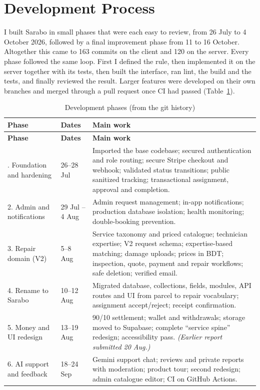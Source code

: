 \documentclass{standalone}
\begin{document}
\section{Development Process}
I built Sarabo in small phases that were each easy to review, from 26 July to 4 October 2026, followed by a final improvement phase from 11 to 16 October. Altogether this came to 163 commits on the client and 120 on the server. Every phase followed the same loop. First I defined the rule, then implemented it on the server together with its tests, then built the interface, ran lint, the build and the tests, and finally reviewed the result. Larger features were developed on their own branches and merged through a pull request once CI had passed (Table~\ref{tab:phases}).

\begin{longtable}{@{}p{3.2cm}p{2.2cm}p{8.8cm}@{}}
\caption{Development phases (from the git history)}\label{tab:phases}\\
\toprule
\textbf{Phase} & \textbf{Dates} & \textbf{Main work} \\
\midrule
\endfirsthead
\toprule
\textbf{Phase} & \textbf{Dates} & \textbf{Main work} \\
\midrule
\endhead
\bottomrule
\endfoot
1. Foundation and hardening & 26--28 Jul & Imported the base codebase; secured authentication and role routing; secure Stripe checkout and webhook; validated status transitions; public sanitized tracking; transactional assignment, approval and completion. \\
2. Admin and notifications & 29 Jul -- 4 Aug & Admin request management; in-app notifications; production database isolation; health monitoring; double-booking prevention. \\
3. Repair domain (V2) & 5--8 Aug & Service taxonomy and priced catalogue; technician expertise; V2 request schema; expertise-based matching; damage uploads; prices in BDT; inspection, quote, payment and repair workflows; safe deletion; verified email. \\
4. Rename to Sarabo & 10--12 Aug & Migrated database, collections, fields, modules, API routes and UI from parcel to repair vocabulary; assignment accept/reject; receipt confirmation. \\
5. Money and UI redesign & 13--19 Aug & 90/10 settlement; wallet and withdrawals; storage moved to Supabase; complete ``service spine'' redesign; accessibility pass. \textit{(Earlier report submitted 20 Aug.)} \\
6. AI support and feedback & 18--24 Sep & Gemini support chat; reviews and private reports with moderation; product tour; second redesign; admin catalogue editor; CI on GitHub Actions. \\

\end{longtable}
\end{document}
